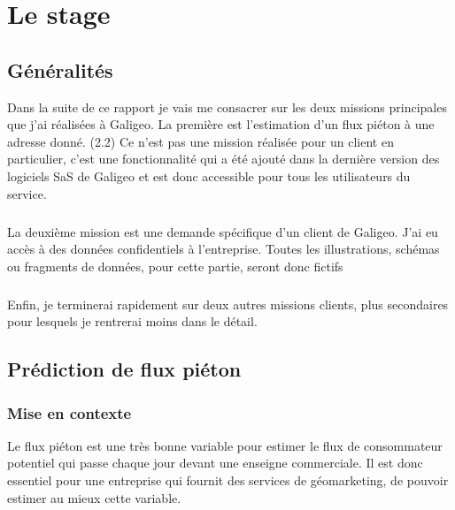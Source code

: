 \chapter[Le stage \ensg]{Le stage}

\section{Généralités}

Dans la suite de ce rapport je vais me consacrer sur les deux missions principales que j’ai réalisées à Galigeo. La première est l’estimation d’un flux piéton à une adresse donné. (2.2) Ce n’est pas une mission réalisée pour un client en particulier, c’est une fonctionnalité qui a été ajouté dans la dernière version des logiciels SaS de Galigeo et est donc accessible pour tous les utilisateurs du service.

\paragraph*{}

La deuxième mission est une demande spécifique d’un client de Galigeo. J’ai eu accès à des données confidentiels à l’entreprise. Toutes les illustrations, schémas ou fragments de données, pour cette partie, seront donc fictifs

\paragraph*{}

Enfin, je terminerai rapidement sur deux autres missions clients, plus secondaires pour lesquels je rentrerai moins dans le détail.


\section{Prédiction de flux piéton}

\subsection{Mise en contexte}

Le flux piéton est une très bonne variable pour estimer le flux de consommateur potentiel qui passe chaque jour devant une enseigne commerciale. Il est donc essentiel pour une entreprise qui fournit des services de géomarketing, de pouvoir estimer au mieux cette variable.

\paragraph*{}

